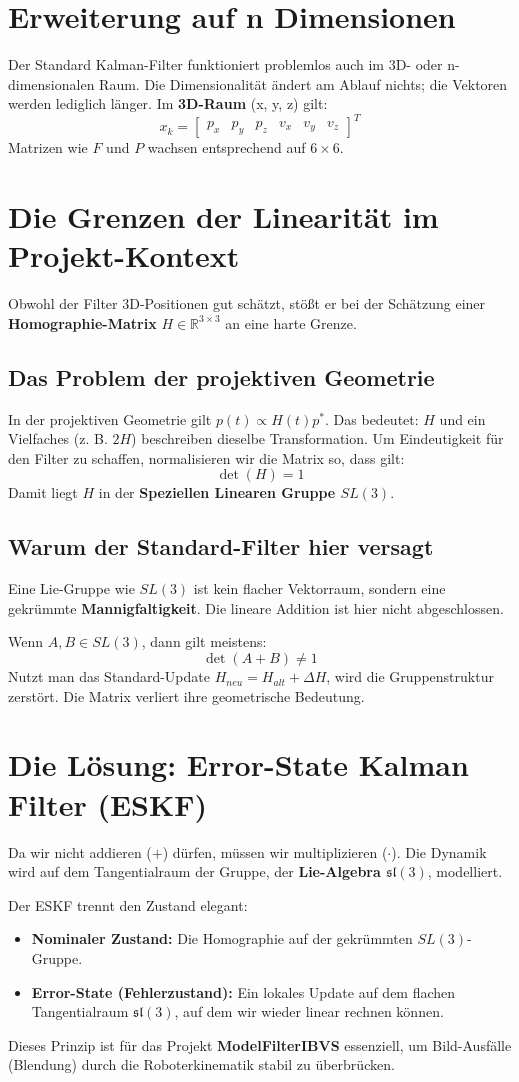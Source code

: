 \documentclass[11pt, a4paper]{article}
\begin{document}
\section{Erweiterung auf n Dimensionen}
Der Standard Kalman-Filter funktioniert problemlos auch im 3D- oder n-dimensionalen Raum. Die Dimensionalität ändert am Ablauf nichts; die Vektoren werden lediglich länger. Im \textbf{3D-Raum} (x, y, z) gilt:
\[ x_k = \begin{bmatrix} p_x & p_y & p_z & v_x & v_y & v_z \end{bmatrix}^T \]
Matrizen wie $F$ und $P$ wachsen entsprechend auf $6 \times 6$.

\section{Die Grenzen der Linearität im Projekt-Kontext}
Obwohl der Filter 3D-Positionen gut schätzt, stößt er bei der Schätzung einer \textbf{Homographie-Matrix} $H \in \mathbb{R}^{3 \times 3}$ an eine harte Grenze.

\subsection{Das Problem der projektiven Geometrie}
In der projektiven Geometrie gilt $p(t) \propto H(t) p^*$. Das bedeutet: $H$ und ein Vielfaches (z. B. $2H$) beschreiben dieselbe Transformation. Um Eindeutigkeit für den Filter zu schaffen, normalisieren wir die Matrix so, dass gilt:
\[ \det(H) = 1 \]
Damit liegt $H$ in der \textbf{Speziellen Linearen Gruppe $SL(3)$}.

\subsection{Warum der Standard-Filter hier versagt}
Eine Lie-Gruppe wie $SL(3)$ ist kein flacher Vektorraum, sondern eine gekrümmte \textbf{Mannigfaltigkeit}. Die lineare Addition ist hier nicht abgeschlossen.

Wenn $A, B \in SL(3)$, dann gilt meistens:
\[ \det(A + B) \neq 1 \]
Nutzt man das Standard-Update $H_{neu} = H_{alt} + \Delta H$, wird die Gruppenstruktur zerstört. Die Matrix verliert ihre geometrische Bedeutung.

\section{Die Lösung: Error-State Kalman Filter (ESKF)}
Da wir nicht addieren ($+$) dürfen, müssen wir multiplizieren ($\cdot$). Die Dynamik wird auf dem Tangentialraum der Gruppe, der \textbf{Lie-Algebra $\mathfrak{sl}(3)$}, modelliert.

Der ESKF trennt den Zustand elegant:
\begin{itemize}
    \item \textbf{Nominaler Zustand:} Die Homographie auf der gekrümmten $SL(3)$-Gruppe.
    \item \textbf{Error-State (Fehlerzustand):} Ein lokales Update auf dem flachen Tangentialraum $\mathfrak{sl}(3)$, auf dem wir wieder linear rechnen können.
\end{itemize}
Dieses Prinzip ist für das Projekt \textbf{ModelFilterIBVS} essenziell, um Bild-Ausfälle (Blendung) durch die Roboterkinematik stabil zu überbrücken.
\end{document}
